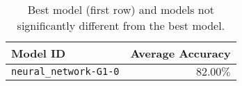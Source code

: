 \begin{table}[H]
    \centering
    \begin{tabular}{|l|r|}
        \hline
        \textbf{Model ID} & \textbf{Average Accuracy} \\
        \hline
        \texttt{neural\_network-G1-0} & $82.00\%$ \\
        \hline
    \end{tabular}
    \caption{Best model (first row) and models not significantly different from the best model.}
    \label{tab:best_models}
\end{table}